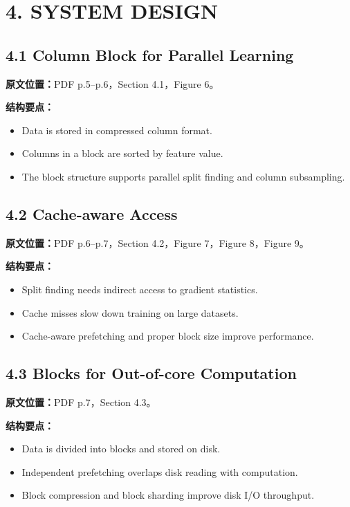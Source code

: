 \section{4. SYSTEM DESIGN}

\subsection{4.1 Column Block for Parallel Learning}

\textbf{原文位置：}PDF p.5--p.6，Section 4.1，Figure 6。

\textbf{结构要点：}
\begin{itemize}
  \item Data is stored in compressed column format.
  \item Columns in a block are sorted by feature value.
  \item The block structure supports parallel split finding and column subsampling.
\end{itemize}

\subsection{4.2 Cache-aware Access}

\textbf{原文位置：}PDF p.6--p.7，Section 4.2，Figure 7，Figure 8，Figure 9。

\textbf{结构要点：}
\begin{itemize}
  \item Split finding needs indirect access to gradient statistics.
  \item Cache misses slow down training on large datasets.
  \item Cache-aware prefetching and proper block size improve performance.
\end{itemize}

\subsection{4.3 Blocks for Out-of-core Computation}

\textbf{原文位置：}PDF p.7，Section 4.3。

\textbf{结构要点：}
\begin{itemize}
  \item Data is divided into blocks and stored on disk.
  \item Independent prefetching overlaps disk reading with computation.
  \item Block compression and block sharding improve disk I/O throughput.
\end{itemize}

